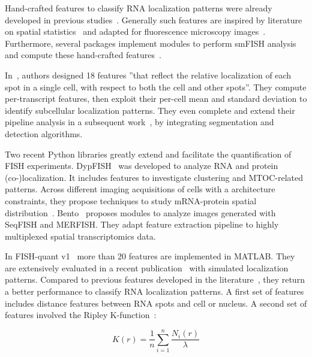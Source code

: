 Hand-crafted features to classify \ac{RNA} localization patterns were already developed in previous studies~\cite{battich_image-based_2013,samacoits_computational_2018}.
Generally such features are inspired by literature on spatial statistics~\cite{ripley2005spatial} and adapted for fluorescence microscopy images~\cite{lagache_statistical_2015,stueland_rdi_2019}.
Furthermore, several packages implement modules to perform \ac{smFISH} analysis and compute these hand-crafted features~\cite{mueller_fish-quant_2013,savulescu_dypfish_2019,mah_bento_2022}.

In~\cite{battich_image-based_2013}, authors designed 18 features ''that reflect the relative localization of each spot in a single cell, with respect to both the cell and other spots''.
They compute per-transcript features, then exploit their per-cell mean and standard deviation to identify subcellular localization patterns.
They even complete and extend their pipeline analysis in a subsequent work~\cite{stoeger_computer_2015}, by integrating segmentation and detection algorithms.

Two recent Python libraries greatly extend and facilitate the quantification of \ac{FISH} experiments.
DypFISH~\cite{savulescu_dypfish_2019} was developed to analyze \ac{RNA} and protein (co-)localization.
It includes features to investigate clustering and \ac{MTOC}-related patterns.
Across different imaging acquisitions of cells with a architecture constraints, they propose techniques to study \ac{mRNA}-protein spatial distribution~\cite{savulescu_interrogating_2021}.
Bento~\cite{mah_bento_2022} proposes modules to analyze images generated with \ac{SeqFISH} and \ac{MERFISH}.
They adapt feature extraction pipeline to highly multiplexed spatial transcriptomics data.

In FISH-quant v1~\cite{mueller_fish-quant_2013} more than 20 features are implemented in MATLAB.
They are extensively evaluated in a recent publication~\cite{samacoits_computational_2018} with simulated localization patterns.
Compared to previous features developed in the literature~\cite{battich_image-based_2013}, they return a better performance to classify \ac{RNA} localization patterns.
A first set of features includes distance features between \ac{RNA} spots and cell or nucleus.
A second set of features involved the Ripley K-function~\cite{ripley2005spatial}:

\begin{equation}
	{\displaystyle K(r) = \frac{1}{n} \sum_{i = 1}^{n} \frac{N_i(r)}{\lambda}}
\end{equation}

